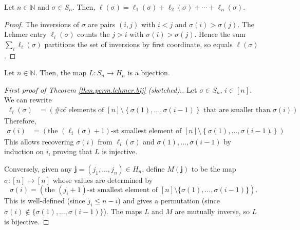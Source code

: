 \begin{proposition}
\label{prop.perm.lehmer.l}
\leantarget
\leanok
Let $n\in\mathbb{N}$ and $\sigma\in S_{n}$. Then,
$\ell\left(\sigma\right)=\ell_{1}\left(\sigma\right)+\ell_{2}\left(
\sigma\right)+\cdots+\ell_{n}\left(\sigma\right)$.
\end{proposition}

\begin{proof}
\leanok
The inversions of $\sigma$ are pairs $(i,j)$ with $i<j$ and $\sigma(i)>\sigma(j)$.
The Lehmer entry $\ell_i(\sigma)$ counts the $j>i$ with $\sigma(i)>\sigma(j)$.
Hence the sum $\sum_i \ell_i(\sigma)$ partitions the set of inversions
by first coordinate, so equals $\ell(\sigma)$.
\end{proof}

\begin{theorem}
\label{thm.perm.lehmer.bij}
\leantarget
\leanok
Let $n\in\mathbb{N}$. Then, the map $L:S_{n}\rightarrow H_{n}$ is a bijection.
\end{theorem}

\begin{proof}[First proof of Theorem \ref{thm.perm.lehmer.bij} (sketched).]
\leanok
Let $\sigma\in S_{n}$, $i\in[n]$.
We can rewrite
\begin{align}
\ell_{i}\left(\sigma\right)
&= \left(\text{\# of elements of }
\left[n\right]\setminus\left\{\sigma\left(1\right),\ldots,\sigma\left(i-1\right)\right\}
\text{ that are smaller than }\sigma\left(i\right)\right).
\label{eq.thm.perm.lehmer.bij.1st.1}
\end{align}
Therefore,
\begin{align}
\sigma\left(i\right) &= \left(\text{the }\left(\ell_{i}\left(\sigma\right)+1\right)\text{-st
smallest element of }
\left[n\right]\setminus\left\{\sigma\left(1\right),\ldots,\sigma\left(i-1\right)\right\}\right).
\label{eq.thm.perm.lehmer.bij.1st.2}
\end{align}
This allows recovering $\sigma(i)$ from $\ell_i(\sigma)$ and $\sigma(1),\ldots,\sigma(i-1)$
by induction on $i$, proving that $L$ is injective.

Conversely, given any $\mathbf{j} = (j_1,\ldots,j_n) \in H_n$,
define $M(\mathbf{j})$ to be the map $\sigma:[n]\to[n]$ whose values are determined by
\[
\sigma(i) = (\text{the }(j_i+1)\text{-st smallest element of }
[n]\setminus\{\sigma(1),\ldots,\sigma(i-1)\}).
\]
This is well-defined (since $j_i \le n - i$) and gives a permutation
(since $\sigma(i) \notin \{\sigma(1),\ldots,\sigma(i-1)\}$).
The maps $L$ and $M$ are mutually inverse, so $L$ is bijective.
\end{proof}

